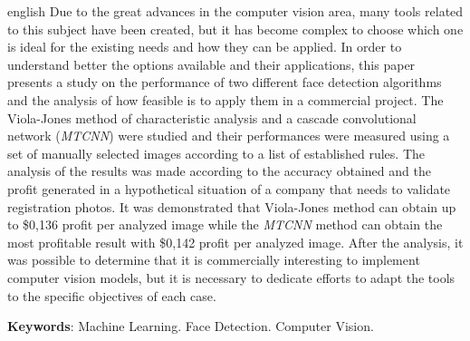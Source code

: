 \begin{resumo}[Abstract]
  \begin{otherlanguage*}{english}
    Due to the great advances in the computer vision area, many tools related to this subject have been created, but it has become complex to choose which one is ideal for the existing needs and how they can be applied. In order to understand better the options available and their applications, this paper presents a study on the performance of two different face detection algorithms and the analysis of how feasible is to apply them in a commercial project. The Viola-Jones method of characteristic analysis and a cascade convolutional network (\textit{MTCNN}) were studied and their performances were measured using a set of manually selected images according to a list of established rules. The analysis of the results was made according to the accuracy obtained and the profit generated in a hypothetical situation of a company that needs to validate registration photos. It was demonstrated that Viola-Jones method can obtain up to \$0,136 profit per analyzed image while the \textit{MTCNN} method can obtain the most profitable result with \$0,142 profit per analyzed image. After the analysis, it was possible to determine that it is commercially interesting to implement computer vision models, but it is necessary to dedicate efforts to adapt the tools to the specific objectives of each case.

    \vspace{\onelineskip}

    \noindent
    \textbf{Keywords}: Machine Learning. Face Detection. Computer Vision.
  \end{otherlanguage*}
\end{resumo}